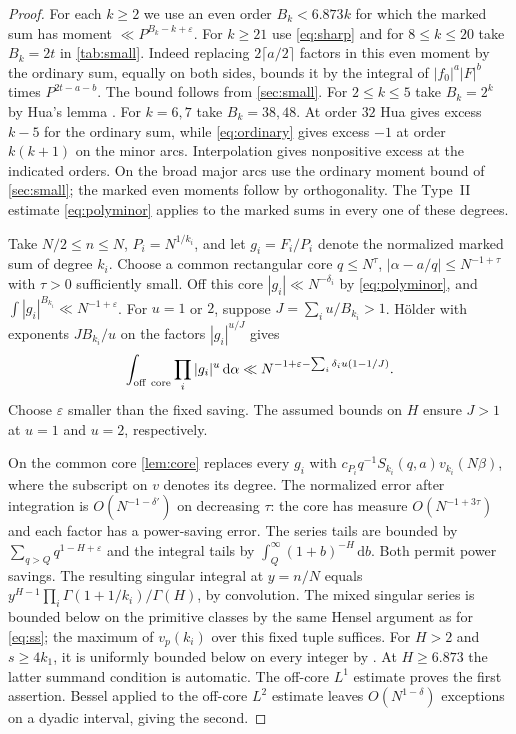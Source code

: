 \documentclass[11pt,letterpaper]{article}
\theoremstyle{definition}
\newcommand{\dd}{\,\mathrm d}
\newcommand{\eps}{\varepsilon}
\begin{document}
\begin{proof}
For each $k\ge2$ we use an even order $B_k<6.873k$ for which
the marked sum has moment $\ll P^{B_k-k+\eps}$. For $k\ge21$ use
\eqref{eq:sharp} and for $8\le k\le20$ take $B_k=2t$ in
\cref{tab:small}. Indeed replacing $2\lceil a/2\rceil$ factors in this
even moment by the ordinary sum, equally on both sides, bounds it by
the integral of $|f_0|^a|F|^b$ times $P^{2t-a-b}$. The bound follows
from \cref{sec:small}. For $2\le k\le5$ take $B_k=2^k$ by Hua's lemma
\cite[Lemma 2.5]{Vbook}. For $k=6,7$ take $B_k=38,48$.
At order $32$ Hua gives excess $k-5$ for the ordinary sum, while
\eqref{eq:ordinary} gives excess $-1$ at order $k(k+1)$ on the
minor arcs. Interpolation gives nonpositive excess at the indicated
orders. On the broad major arcs use the ordinary moment bound of
\cref{sec:small}; the marked even moments follow by orthogonality.
The Type~II estimate \eqref{eq:polyminor} applies to the marked
sums in every one of these degrees.

Take $N/2\le n\le N$, $P_i=N^{1/k_i}$, and let
$g_i=F_i/P_i$ denote the normalized marked sum of degree $k_i$.
Choose a common rectangular core $q\le N^\tau$,
$|\alpha-a/q|\le N^{-1+\tau}$ with $\tau>0$ sufficiently small.
Off this core $|g_i|\ll N^{-\delta_i}$ by \eqref{eq:polyminor},
and $\int|g_i|^{B_{k_i}}\ll N^{-1+\eps}$. For $u=1$ or $2$,
suppose $J=\sum_i u/B_{k_i}>1$. H\"older with exponents
$J B_{k_i}/u$ on the factors $|g_i|^{u/J}$ gives
\[
 \int_{\rm off\ core} \prod_i|g_i|^u\dd\alpha
 \ll N^{-1+\eps-\sum_i\delta_i u(1-1/J)} .
\]
Choose $\eps$ smaller than the fixed saving. The assumed bounds on
$H$ ensure $J>1$ at $u=1$ and $u=2$, respectively.

On the common core \cref{lem:core} replaces every $g_i$ with
$c_{P_i}q^{-1}S_{k_i}(q,a)v_{k_i}(N\beta)$, where the subscript on
$v$ denotes its degree. The normalized error after integration is
$O(N^{-1-\delta'})$ on decreasing $\tau$: the core has measure
$O(N^{-1+3\tau})$ and each factor has a power-saving error.
The series tails are bounded by $\sum_{q>Q}q^{1-H+\eps}$ and the integral
tails by $\int_Q^\infty(1+b)^{-H}\dd b$. Both permit power savings.
The resulting singular integral at $y=n/N$ equals
$y^{H-1}\prod_i\Gamma(1+1/k_i)/\Gamma(H)$, by convolution.
The mixed singular series is bounded below on the primitive classes
by the same Hensel argument as for \eqref{eq:ss}; the maximum of
$v_p(k_i)$ over this fixed tuple suffices. For $H>2$ and $s\ge4k_1$,
it is uniformly bounded below on every integer by
\cite[Lemma 7.2]{BWmix}. At $H\ge6.873$ the latter summand condition
is automatic. The off-core $L^1$ estimate proves the first assertion.
Bessel applied to the off-core $L^2$ estimate leaves $O(N^{1-\delta})$
exceptions on a dyadic interval, giving the second.
\end{proof}
\end{document}
